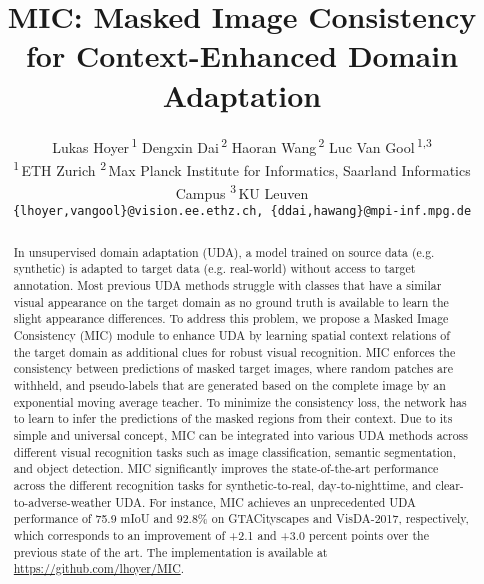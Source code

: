 \documentclass[10pt,twocolumn,letterpaper]{article}
\begin{document}
\title{MIC: Masked Image Consistency for Context-Enhanced Domain Adaptation}

\author{
   Lukas Hoyer\,\textsuperscript{1} \quad
   Dengxin Dai\,\textsuperscript{2} \quad
   Haoran Wang\,\textsuperscript{2} \quad
   Luc Van Gool\,\textsuperscript{1,3} \\
   \textsuperscript{1}\,ETH Zurich \enskip
   \textsuperscript{2}\,Max Planck Institute for Informatics, Saarland Informatics Campus \enskip
   \textsuperscript{3}\,KU Leuven \\
   {\tt\small \{lhoyer,vangool\}@vision.ee.ethz.ch, \{ddai,hawang\}@mpi-inf.mpg.de}
}
\maketitle

\begin{abstract}
   In unsupervised domain adaptation (UDA), a model trained on source data (e.g. synthetic) is adapted to target data (e.g. real-world) without access to target annotation.
   Most previous UDA methods struggle with classes that have a similar visual appearance on the target domain as no ground truth is available to learn the slight appearance differences. To address this problem, we propose a Masked Image Consistency (MIC) module to enhance UDA by learning spatial context relations of the target domain as additional clues for robust visual recognition.
   MIC enforces the consistency between predictions of masked target images, where random patches are withheld, and pseudo-labels that are generated based on the complete image by an exponential moving average teacher. To minimize the consistency loss, the network has to learn to infer the predictions of the masked regions from their context.
   Due to its simple and universal concept, MIC can be integrated into various UDA methods across different visual recognition tasks such as image classification, semantic segmentation, and object detection. MIC significantly improves the state-of-the-art performance across the different recognition tasks for synthetic-to-real, day-to-nighttime, and clear-to-adverse-weather UDA. For instance, MIC achieves an unprecedented UDA performance of 75.9 mIoU and 92.8\% on GTACityscapes and VisDA-2017, respectively, which corresponds to an improvement of +2.1 and +3.0 percent points over the previous state of the art. The implementation is available at \url{https://github.com/lhoyer/MIC}.
\end{abstract}

 
\end{document}
